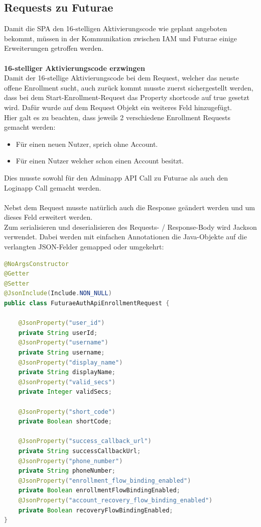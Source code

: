 \subsection{Requests zu Futurae}\label{subsec:reqtofuturae}
Damit die SPA den 16-stelligen Aktivierungscode wie geplant angeboten bekommt, müssen in der Kommunikation zwischen IAM und Futurae einige Erweiterungen getroffen werden.\\
\\
\textbf{16-stelliger Aktivierungscode erzwingen}\\
Damit der 16-stellige Aktivierungscode bei dem Request, welcher das neuste offene Enrollment sucht, auch zurück kommt musste zuerst sichergestellt werden, dass bei dem Start-Enrollment-Request das Property \flqq shortcode\frqq{} auf true gesetzt wird. Dafür wurde auf dem Request Objekt ein weiteres Feld hinzugefügt.\\
Hier galt es zu beachten, dass jeweils 2 verschiedene Enrollment Requests gemacht werden:
\begin{itemize}
	\item Für einen neuen Nutzer, sprich ohne Account.
	\item Für einen Nutzer welcher schon einen Account besitzt. 
\end{itemize}
Dies musste sowohl für den Adminapp API Call zu Futurae als auch den Loginapp Call gemacht werden.
\\
\\
Nebst dem Request musste natürlich auch die Response geändert werden und um dieses Feld erweitert werden.
\\
Zum serialisieren und deserialisieren des Requests- / Response-Body wird Jackson verwendet. Dabei werden mit einfachen Annotationen die Java-Objekte auf die verlangten JSON-Felder gemapped oder umgekehrt:
\captionsetup[lstlisting]{labelformat=empty}
\begin{lstlisting}[language=Java, caption={Beispiel, wie Jackson auf dem Futurae Request zur Auth API (für die Self-Services) verwendet wird. (Enthält bereits das neue Feld \flqq short\_code\frqq{}).}]
@NoArgsConstructor
@Getter
@Setter
@JsonInclude(Include.NON_NULL)
public class FuturaeAuthApiEnrollmentRequest {
	
	@JsonProperty("user_id")
	private String userId;
	@JsonProperty("username")
	private String username;
	@JsonProperty("display_name")
	private String displayName;
	@JsonProperty("valid_secs")
	private Integer validSecs;
	
	@JsonProperty("short_code")
	private Boolean shortCode;
	
	@JsonProperty("success_callback_url")
	private String successCallbackUrl;
	@JsonProperty("phone_number")
	private String phoneNumber;
	@JsonProperty("enrollment_flow_binding_enabled")
	private Boolean enrollmentFlowBindingEnabled;
	@JsonProperty("account_recovery_flow_binding_enabled")
	private Boolean recoveryFlowBindingEnabled;
}
\end{lstlisting}
